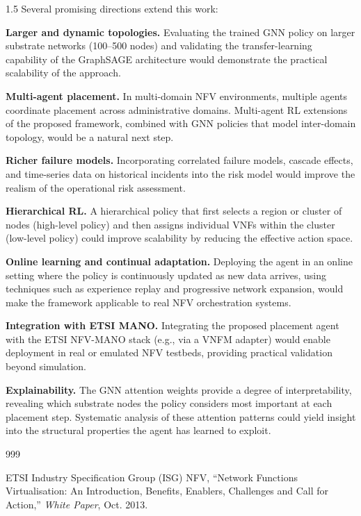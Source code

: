 \documentclass[A4paper,12pt]{report}
\theoremstyle{plain}
\theoremstyle{definition}
\theoremstyle{remark}
\numberwithin{equation}{section}
\begin{document}
\begin{spacing}{1.5}
Several promising directions extend this work:

\textbf{Larger and dynamic topologies.} Evaluating the trained GNN policy on larger substrate networks (100–500 nodes) and validating the transfer-learning capability of the GraphSAGE architecture would demonstrate the practical scalability of the approach.

\textbf{Multi-agent placement.} In multi-domain NFV environments, multiple agents coordinate placement across administrative domains. Multi-agent RL extensions of the proposed framework, combined with GNN policies that model inter-domain topology, would be a natural next step.

\textbf{Richer failure models.} Incorporating correlated failure models, cascade effects, and time-series data on historical incidents into the risk model would improve the realism of the operational risk assessment.

\textbf{Hierarchical RL.} A hierarchical policy that first selects a region or cluster of nodes (high-level policy) and then assigns individual VNFs within the cluster (low-level policy) could improve scalability by reducing the effective action space.

\textbf{Online learning and continual adaptation.} Deploying the agent in an online setting where the policy is continuously updated as new data arrives, using techniques such as experience replay and progressive network expansion, would make the framework applicable to real NFV orchestration systems.

\textbf{Integration with ETSI MANO.} Integrating the proposed placement agent with the ETSI NFV-MANO stack (e.g., via a VNFM adapter) would enable deployment in real or emulated NFV testbeds, providing practical validation beyond simulation.

\textbf{Explainability.} The GNN attention weights provide a degree of interpretability, revealing which substrate nodes the policy considers most important at each placement step. Systematic analysis of these attention patterns could yield insight into the structural properties the agent has learned to exploit.

\begin{thebibliography}{999}

ETSI Industry Specification Group (ISG) NFV, ``Network Functions Virtualisation: An Introduction, Benefits, Enablers, Challenges and Call for Action,'' \textit{White Paper}, Oct. 2013.


\end{thebibliography}
\end{spacing}
\end{document}
